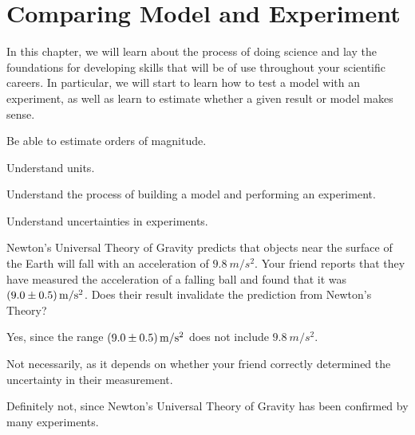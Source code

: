%
\chapter{Comparing Model and Experiment}
\label{chap:modelandexperiment}
In this chapter, we will learn about the process of doing science and lay the foundations for developing skills that will be of use throughout your scientific careers. In particular, we will start to learn how to test a model with an experiment, as well as learn to estimate whether a given result or model makes sense.
\begin{learningObjectives}{
\item Be able to estimate orders of magnitude.
\item Understand units.
\item Understand the process of building a model and performing an experiment.
\item Understand uncertainties in experiments.}
\end{learningObjectives}
\begin{opening}
\begin{MCquestion}{Newton's Universal Theory of Gravity predicts that objects near the surface of the Earth will fall with an acceleration of $\SI{9.8}{m/s^2}$. Your friend reports that they have measured the acceleration of a falling ball and found that it was $\SI{9.0\pm 0.5}{m/s^2}$. Does their result invalidate the prediction from Newton's Theory?}
\item Yes, since the range $\SI{9.0\pm 0.5}{m/s^2}$ does not include $\SI{9.8}{m/s^2}$.
\item Not necessarily, as it depends on whether your friend correctly determined the uncertainty in their measurement.\correct
\item Definitely not, since Newton's Universal Theory of Gravity has been confirmed by many experiments.
\end{MCquestion}
\end{opening}

